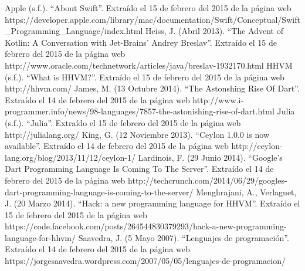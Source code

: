 \documentclass[a4paper,11pt]{article}
\begin{document}
\begin{thebibliography}{50}
	 Apple (s.f.). “About Swift”. Extraído el 15 de febrero del 2015 de la página web https://developer.apple.com/library/mac/documentation/Swift/Conceptual/Swift\_Pr\linebreak ogramming\_Language/index.html
	 Heiss, J. (Abril 2013). “The Advent of Kotlin: A Conversation with Jet-Brains’ Andrey Breslav”. Extraído el 15 de febrero del 2015 de la página web http://www.oracle.com/technetwork/articles/java/breslav-1932170.html
	 HHVM (s.f.). “What is HHVM?”. Extraído el 15 de febrero del 2015 de la página web http://hhvm.com/
	 James, M. (13 Octubre 2014). “The Astonshing Rise Of Dart”. Extraído el 14 de febrero del 2015 de la página web http://www.i-programmer.info/news/98-languages/7857-the-astonishing-rise-of-dart.html
	 Julia (s.f.). “Julia”. Extraído el 15 de febrero del 2015 de la página web http://julialang.org/
	 King, G. (12 Noviembre 2013). “Ceylon 1.0.0 is now available”. Extraído el 14 de febrero del 2015 de la página web http://ceylon-lang.org/blog/2013/11/12/ceylon-1/
	 Lardinois, F. (29 Junio 2014). “Google’s Dart Programming Language Is Coming To The Server”. Extraído el 14 de febrero del 2015 de la página web http://techcrunch.com/2014/06/29/googles-dart-programming-language-is-coming-to-the-server/
	 Menghrajani, A., Verlaguet, J. (20 Marzo 2014). “Hack: a new programming language for HHVM”. Extraído el 15 de febrero del 2015 de la página web https://code.facebook.com/posts/264544830379293/hack-a-new-programming-language-for-hhvm/
	 Saavedra, J. (5 Mayo 2007). “Lenguajes de programación”. Extraído el 14 de febrero del 2015 de la página web https://jorgesaavedra.wordpress.com/2007/05/05/lenguajes-de-programacion/
\end{thebibliography}
\end{document}
